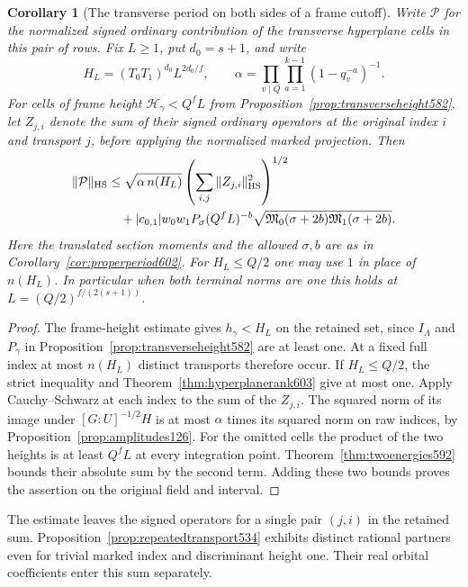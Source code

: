 \documentclass[a4paper,11pt]{article}
\newtheorem{corollary}[proposition]{Corollary}
\theoremstyle{definition}
\theoremstyle{remark}
\numberwithin{equation}{section}
\begin{document}
\begin{corollary}[The transverse period on both sides of a frame cutoff]
\leavevmode\label{cor:oneindexperiod603}
Write \(\mathcal P\) for the normalized signed ordinary
contribution of the transverse hyperplane cells in this pair
of rows. Fix \(L\ge1\), put \(d_0=s+1\), and write
\[
       H_L=(T_0T_1)^{d_0}L^{2d_0/f},\qquad
       \alpha=\prod_{v\mid Q}\prod_{a=1}^{k-1}(1-q_v^{-a})^{-1}.
\]
For cells of frame height \(\mathcal H_\gamma<Q^fL\) from
Proposition~\ref{prop:transverseheight582}, let \(Z_{j,i}\)
denote the sum of their signed ordinary operators at the
original index \(i\) and transport \(j\), before applying
the normalized marked projection. Then
\[
 \begin{split}
 \|\mathcal P\|_{\rm HS}
 &\le \sqrt{\alpha\, n(H_L)}
             \left(\sum_{i,j}\|Z_{j,i}\|_{\rm HS}^2\right)^{1/2}\\
 &\quad + |c_{0,1}|w_0w_1 P_\sigma (Q^fL)^{-b}
             \sqrt{\mathfrak M_0(\sigma+2b)\mathfrak M_1(\sigma+2b)} .
 \end{split}
\]
Here the translated section moments and the allowed
\(\sigma,b\) are as in Corollary~\ref{cor:properperiod602}.
For \(H_L\le Q/2\) one may use \(1\) in place of \(n(H_L)\).
In particular when both terminal norms are one this holds at
\(L=(Q/2)^{f/(2(s+1))}\).
\end{corollary}
\begin{proof}
The frame-height estimate gives \(h_\gamma<H_L\) on the
retained set, since \(I_\Lambda\) and \(P_\gamma\) in
Proposition~\ref{prop:transverseheight582} are at least one.
At a fixed full index at most \(n(H_L)\) distinct transports
therefore occur. If \(H_L\le Q/2\), the strict inequality
and Theorem~\ref{thm:hyperplanerank603} give at most one.
Apply Cauchy--Schwarz at each index to the sum of the
\(Z_{j,i}\). The squared norm of its image under
\([G:U]^{-1/2}H\) is at most \(\alpha\) times its squared
norm on raw indices, by Proposition~\ref{prop:amplitudes126}.
For the omitted cells the product of the two heights is at
least \(Q^f L\) at every integration point. Theorem~\ref{thm:twoenergies592}
bounds their absolute sum by the second term. Adding these
two bounds proves the assertion on the original field and
interval.
\end{proof}

The estimate leaves the signed operators for a single pair
\((j,i)\) in the retained sum. Proposition~\ref{prop:repeatedtransport534}
exhibits distinct rational partners even for trivial marked
index and discriminant height one. Their real orbital
coefficients enter this sum separately.
\end{document}

